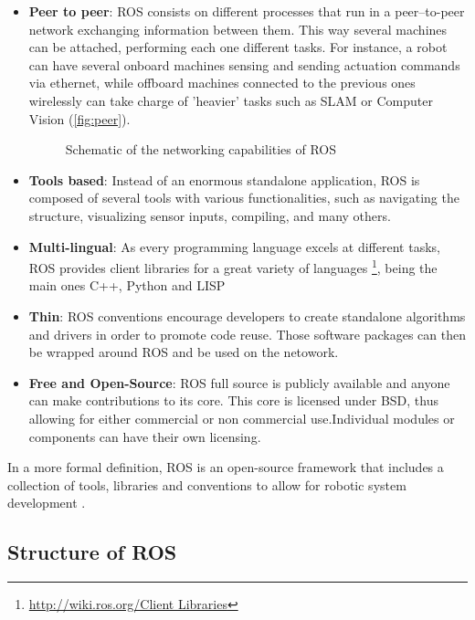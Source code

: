\begin{itemize}
  \item \textbf{Peer to peer}: ROS consists on different processes that run in a peer--to-peer network exchanging information between them. This way several machines can be attached, performing each one different tasks. For instance, a robot can have several onboard machines sensing and sending actuation commands via ethernet, while offboard machines connected to the previous ones wirelessly can take charge of 'heavier' tasks such as SLAM or Computer Vision (\autoref{fig:peer}).

  \begin{figure}[htb]
    \centering
    \caption{Schematic of the networking capabilities of ROS}
    \label{fig:peer}
  \end{figure}

  \item \textbf{Tools based}: Instead of an enormous standalone application, ROS is composed of several tools with various functionalities, such as navigating the structure, visualizing sensor inputs, compiling, and many others.

  \item \textbf{Multi-lingual}: As every programming language excels at different tasks, ROS provides client libraries for a great variety of languages \footnote{\url{http://wiki.ros.org/Client Libraries}}, being the main ones C++, Python and LISP

  \item \textbf{Thin}: ROS conventions encourage developers to create standalone algorithms and drivers in order to promote code reuse. Those software packages can then be wrapped around ROS and be used on the netowork.

  \item \textbf{Free and Open-Source}: ROS full source is publicly available and anyone can make contributions to its core. This core is licensed under BSD, thus allowing for either commercial or non commercial use.Individual modules or components can have their own licensing.
\end{itemize}

In a more formal definition, ROS is an open-source framework that includes a collection of tools, libraries and conventions to allow for robotic system development . 

\subsection{Structure of ROS}

